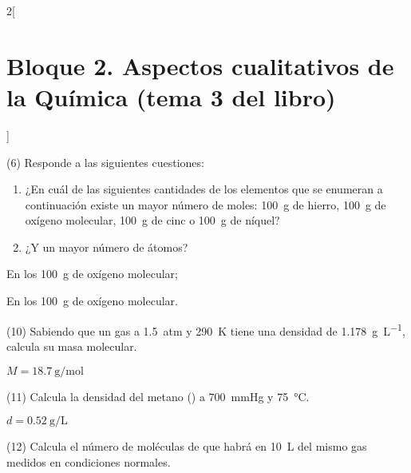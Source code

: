 \documentclass[10pt]{article}
\begin{document}
\begin{multicols}{2}[
    \section{Bloque 2. Aspectos cualitativos de la Química (tema 3 del libro)}
  ]
\begin{exercise}[
    tags    = {},
    topics  = {química,química básica},
    source  = {FQ 1B MGH 2016, p66, e6},
  ]
  (6) Responde a las siguientes cuestiones:
  \begin{enumerate}
    \item ¿En cuál de las siguientes cantidades de los elementos que se enumeran a continuación existe un mayor número de moles: \SI{100}{\gram} de hierro, \SI{100}{\gram} de oxígeno molecular, \SI{100}{\gram} de cinc o \SI{100}{\gram} de níquel?
    \item ¿Y un mayor número de átomos?
  \end{enumerate}
\end{exercise}

\begin{solution}
  \begin{enumerate*}
    \item En los \SI{100}{\gram} de oxígeno molecular;
    \item En los \SI{100}{\gram} de oxígeno molecular.
  \end{enumerate*}
\end{solution}




\begin{exercise}[
    tags    = {},
    topics  = {química,química básica},
    source  = {FQ 1B MGH 2016, p71, e10},
  ]
  (10) Sabiendo que un gas a \SI{1,5}{atm} y \SI{290}{\kelvin} tiene una densidad de \SI{1,178}{\gram\per\liter}, calcula su masa molecular.
\end{exercise}

\begin{solution}
  \( M = \SI{18,7}{\gram\per\mole} \)
\end{solution}




\begin{exercise}[
    tags    = {},
    topics  = {química,química básica},
    source  = {FQ 1B MGH 2016, p71, e11},
  ]
  (11) Calcula la densidad del metano () a \SI{700}{\mmHg} y \SI{75}{\celsius}.
\end{exercise}

\begin{solution}
  \( d = \SI{0,52}{\gram\per\liter} \)
\end{solution}



\begin{exercise}[
    tags    = {},
    topics  = {química,química básica},
    source  = {FQ 1B MGH 2016, p71, e12},
  ]
  (12) Calcula el número de moléculas de  que habrá en \SI{10}{\liter} del mismo gas medidos en condiciones normales.
\end{exercise}


\end{multicols}
\end{document}
